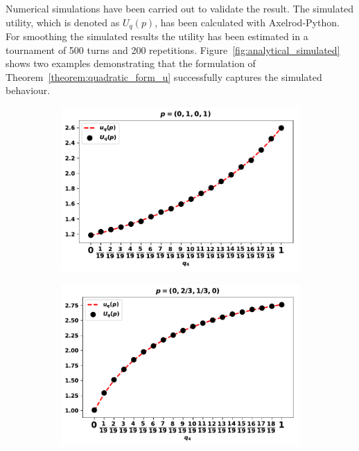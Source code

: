 

Numerical simulations have been carried out to validate the result. The simulated utility, which is
denoted as \(U_q(p)\), has been calculated with Axelrod-Python.
For smoothing the simulated results the utility
has been estimated in a tournament of 500 turns and 200 repetitions.
Figure~\ref{fig:analytical_simulated} shows two examples demonstrating that the
formulation of Theorem~\ref{theorem:quadratic_form_u} successfully captures the
simulated behaviour.

\begin{figure}[!htbp]
    \begin{center}
        \begin{subfigure}{0.45\textwidth}
            \includegraphics[width=\linewidth]{src/chapters/05/paper/Memory-size-in-the-prisoners-dilemma/img/validation_against_player_one.pdf}
        \end{subfigure}
        \begin{subfigure}{0.45\textwidth}
            \includegraphics[width=\linewidth]{src/chapters/05/paper/Memory-size-in-the-prisoners-dilemma/img/validation_against_player_two.pdf}

\end{subfigure}
\end{center}
\end{figure}
